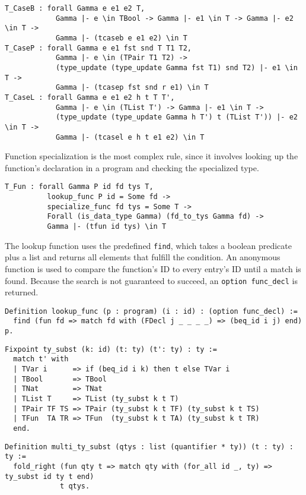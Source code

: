 \documentclass[fleqn]{scrreprt}
\newcommand{\coqinline}[1]{\texttt{#1}}
\begin{document}
\begin{verbatim}
T_CaseB : forall Gamma e e1 e2 T,
            Gamma |- e \in TBool -> Gamma |- e1 \in T -> Gamma |- e2 \in T ->
            Gamma |- (tcaseb e e1 e2) \in T
T_CaseP : forall Gamma e e1 fst snd T T1 T2,
            Gamma |- e \in (TPair T1 T2) ->
            (type_update (type_update Gamma fst T1) snd T2) |- e1 \in T ->
            Gamma |- (tcasep fst snd r e1) \in T
T_CaseL : forall Gamma e e1 e2 h t T T',
            Gamma |- e \in (TList T') -> Gamma |- e1 \in T ->
            (type_update (type_update Gamma h T') t (TList T')) |- e2 \in T ->
            Gamma |- (tcasel e h t e1 e2) \in T
\end{verbatim}
Function specialization is the most complex rule, since it involves looking up the function's declaration in a program and checking the specialized type.
\begin{verbatim}
T_Fun : forall Gamma P id fd tys T,
          lookup_func P id = Some fd ->
          specialize_func fd tys = Some T ->
          Forall (is_data_type Gamma) (fd_to_tys Gamma fd) ->
          Gamma |- (tfun id tys) \in T
\end{verbatim}
The lookup function uses the predefined \coqinline{find}, which takes a boolean predicate plus a list and returns all elements that fulfill the condition. An anonymous function is used to compare the function's ID to every entry's ID until a match is found. Because  the search is not guaranteed to succeed, an \coqinline{option func_decl} is returned.
\begin{verbatim}
Definition lookup_func (p : program) (i : id) : (option func_decl) :=
  find (fun fd => match fd with (FDecl j _ _ _ _) => (beq_id i j) end) p.
\end{verbatim}

\begin{verbatim}
Fixpoint ty_subst (k: id) (t: ty) (t': ty) : ty :=
  match t' with
  | TVar i      => if (beq_id i k) then t else TVar i
  | TBool       => TBool
  | TNat        => TNat
  | TList T     => TList (ty_subst k t T)
  | TPair TF TS => TPair (ty_subst k t TF) (ty_subst k t TS)
  | TFun  TA TR => TFun  (ty_subst k t TA) (ty_subst k t TR)
  end.
\end{verbatim}

\begin{verbatim}
Definition multi_ty_subst (qtys : list (quantifier * ty)) (t : ty) : ty := 
  fold_right (fun qty t => match qty with (for_all id _, ty) => ty_subst id ty t end)
             t qtys.
\end{verbatim}
\end{document}
